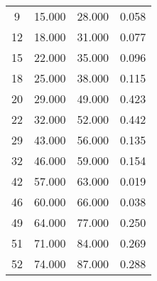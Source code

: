 % 
\begin{tabular}{cccc}
  \hline
  \hline
9 & 15.000 & 28.000 & 0.058 \\ 
  12 & 18.000 & 31.000 & 0.077 \\ 
  15 & 22.000 & 35.000 & 0.096 \\ 
  18 & 25.000 & 38.000 & 0.115 \\ 
  20 & 29.000 & 49.000 & 0.423 \\ 
  22 & 32.000 & 52.000 & 0.442 \\ 
  29 & 43.000 & 56.000 & 0.135 \\ 
  32 & 46.000 & 59.000 & 0.154 \\ 
  42 & 57.000 & 63.000 & 0.019 \\ 
  46 & 60.000 & 66.000 & 0.038 \\ 
  49 & 64.000 & 77.000 & 0.250 \\ 
  51 & 71.000 & 84.000 & 0.269 \\ 
  52 & 74.000 & 87.000 & 0.288 \\ 
   \hline
\end{tabular}
